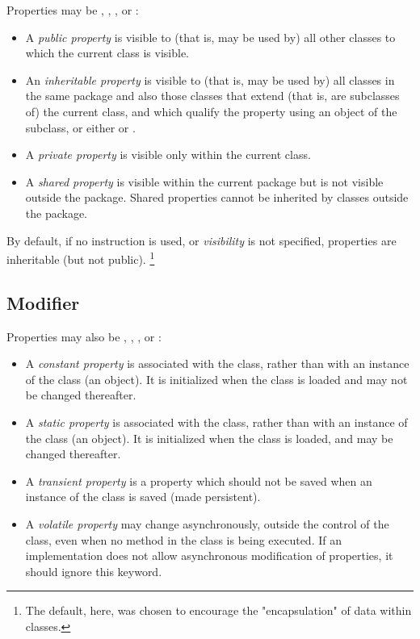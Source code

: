 Properties may be , ,
, or :
\begin{itemize}
\item A \emph{public property} is visible to (that is, may be used by)
all other classes to which the current class is visible.
\item An \emph{inheritable property} is visible to (that is, may be used
by) all classes in the same package and also those classes that extend
(that is, are subclasses of) the current class, and which qualify the
property using an object of the subclass, or either 
or .
\item A \emph{private property} is visible only within the current
class.
\item 
A \emph{shared property} is visible within the current package
but is not visible outside the package.  Shared properties cannot be
inherited by classes outside the package.
\end{itemize}
 
By default, if no  instruction is used,
or \emph{visibility} is not specified, properties
are inheritable (but not public).
\footnote{
The default, here, was chosen to encourage the "encapsulation" of
data within classes.
}
\subsection{Modifier}\label{refpropmod}
 
Properties may also be , ,
, or :
\begin{itemize}
\item 
A \emph{constant property} is associated with the class, rather
than with an instance of the class (an object).
It is initialized when the class is loaded and may not be changed
thereafter.
\item 
A \emph{static property} is associated with the class, rather
than with an instance of the class (an object).
It is initialized when the class is loaded, and may be changed
thereafter.
\item 
A \emph{transient property} is a property which should not be saved when
an instance of the class is saved (made persistent).
\item 
A \emph{volatile property} may change asynchronously, outside the
control of the class, even when no method in the class is being
executed.
If an implementation does not allow asynchronous modification of
properties, it should ignore this keyword.
\end{itemize}
 
